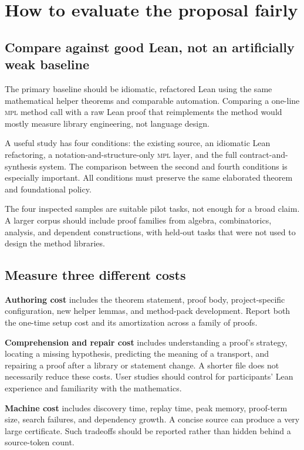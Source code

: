 \documentclass[11pt,a4paper]{article}
\newcommand{\MPL}{\textnormal{\textsc{mpl}}}
\theoremstyle{remark}
\begin{document}
\section{How to evaluate the proposal fairly}
\label{sec:evaluation}

\subsection{Compare against good Lean, not an artificially weak baseline}

The primary baseline should be idiomatic, refactored Lean using the same mathematical helper theorems and comparable automation. Comparing a one-line \MPL{} method call with a raw Lean proof that reimplements the method would mostly measure library engineering, not language design.

A useful study has four conditions: the existing source, an idiomatic Lean refactoring, a notation-and-structure-only \MPL{} layer, and the full contract-and-synthesis system. The comparison between the second and fourth conditions is especially important. All conditions must preserve the same elaborated theorem and foundational policy.

The four inspected samples are suitable pilot tasks, not enough for a broad claim. A larger corpus should include proof families from algebra, combinatorics, analysis, and dependent constructions, with held-out tasks that were not used to design the method libraries.

\subsection{Measure three different costs}

\textbf{Authoring cost} includes the theorem statement, proof body, project-specific configuration, new helper lemmas, and method-pack development. Report both the one-time setup cost and its amortization across a family of proofs.

\textbf{Comprehension and repair cost} includes understanding a proof's strategy, locating a missing hypothesis, predicting the meaning of a transport, and repairing a proof after a library or statement change. A shorter file does not necessarily reduce these costs. User studies should control for participants' Lean experience and familiarity with the mathematics.

\textbf{Machine cost} includes discovery time, replay time, peak memory, proof-term size, search failures, and dependency growth. A concise source can produce a very large certificate. Such tradeoffs should be reported rather than hidden behind a source-token count.
\end{document}
